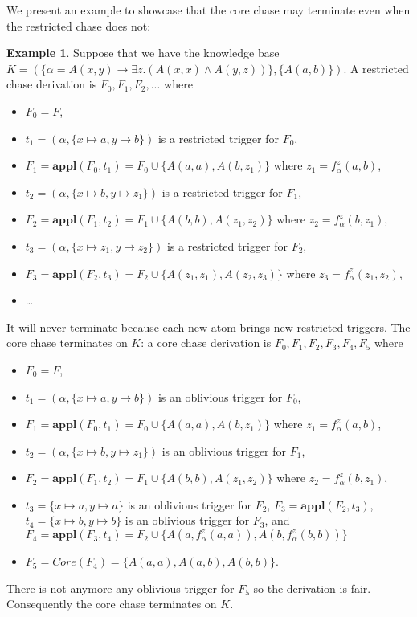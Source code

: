 \documentclass{article}
\theoremstyle{definition}
\newtheorem{example}{Example}[section]
\theoremstyle{remark}
\newcommand{\Appl}{\textbf{appl}}
\begin{document}
We present an example to showcase that the core chase may terminate even when the restricted chase does not:

\begin{example}
Suppose that we have the knowledge base $K=(\{\alpha = A(x,y) \rightarrow \exists z.(A(x,x) \wedge A(y,z))\},\{A(a,b)\})$. A restricted chase derivation is $F_0,F_1,F_2,...$ where 
\begin{itemize}
\item $F_0 = F$,
\item $t_1=(\alpha,\{x \mapsto a, y \mapsto b\})$ is a restricted trigger for $F_0$, 
\item $F_1= \Appl(F_0,t_1)= F_0 \cup \{A(a,a),A(b,z_1)\}$ where $z_1 = f_\alpha^z(a,b)$,
\item $t_2 = (\alpha,\{x \mapsto b, y \mapsto z_1\})$ is a restricted trigger for $F_1$, 
\item $F_2 = \Appl(F_1,t_2)= F_1 \cup \{A(b,b),A(z_1,z_2)\}$ where $z_2 = f_\alpha^z(b,z_1)$, 
\item $t_3 = (\alpha,\{x \mapsto z_1, y \mapsto z_2\})$ is a restricted trigger for $F_2$, 
\item $F_3 = \Appl(F_2,t_3)=  F_2 \cup \{A(z_1,z_1),A(z_2,z_3)\}$ where $z_3 = f_\alpha^z(z_1,z_2)$,
\item \ldots\
\end{itemize}
It will never terminate because each new atom brings new restricted triggers. The core chase terminates on $K$: a core chase derivation is $F_0,F_1,F_2,F_3,F_4,F_5$ where 
\begin{itemize}
\item $F_0=F$, 
\item $t_1=(\alpha,\{x \mapsto a, y \mapsto b\})$ is an oblivious trigger for $F_0$, 
\item $F_1=\Appl(F_0,t_1) =F_0 \cup \{A(a,a),A(b,z_1)\}$ where $z_1 = f_\alpha^z(a,b)$, 
\item $t_2 = (\alpha,\{x \mapsto b, y \mapsto z_1\})$ is an oblivious trigger for $F_1$,
\item $F_2 =\Appl(F_1,t_2) =F_1 \cup \{A(b,b),A(z_1,z_2)\}$ where $z_2 = f_\alpha^z(b,z_1)$,
\item $t_3 = \{x \mapsto a, y \mapsto a\}$ is an oblivious trigger for $F_2$, $F_3=\Appl(F_2,t_3)$, $t_4 = \{x \mapsto b, y \mapsto b\}$ is an oblivious trigger for $F_3$, and $F_4=\Appl(F_3,t_4) = F_2 \cup \{A(a,f_\alpha^z(a,a)),A(b,f_\alpha^z(b,b))\}$
\item $F_5 = \textit{Core}(F_4)= \{A(a,a),A(a,b),A(b,b)\}$.
\end{itemize} 
There is not anymore any oblivious trigger for $F_5$ so the derivation is fair. Consequently the core chase terminates on $K$.

\end{example}
\end{document}
